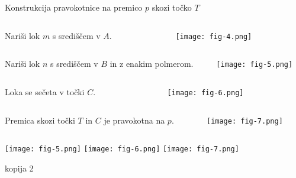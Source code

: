 \begin{frame}{Konstrukcija pravokotnice na premico $p$ skozi točko $T$}
			\begin{columns}
				\begin{column}{0.55\textwidth}
					Nariši lok $m$ s središčem v $A$.
				\end{column}
					\begin{column}{0.45\textwidth}
						\centering
						\texttt{[image: fig-4.png]}
					\end{column}
				\end{columns}


				\begin{columns}
					\begin{column}{0.55\textwidth}
						Nariši lok $n$ s središčem v $B$ in z enakim polmerom.
					\end{column}
						\begin{column}{0.45\textwidth}
							\centering
							\texttt{[image: fig-5.png]}
						\end{column}
					\end{columns}


					\begin{columns}
						\begin{column}{0.55\textwidth}
							Loka se sečeta v točki $C$.
						\end{column}
							\begin{column}{0.45\textwidth}
								\centering
								\texttt{[image: fig-6.png]}
							\end{column}
						\end{columns}


						\begin{columns}
							\begin{column}{0.55\textwidth}
								Premica skozi točki $T$ in $C$ je pravokotna na $p$.
							\end{column}
								\begin{column}{0.45\textwidth}
									\centering
									\texttt{[image: fig-7.png]}
								\end{column}
							\end{columns}

		 
		
		  \texttt{[image: fig-5.png]}
		  \texttt{[image: fig-6.png]}
		  \texttt{[image: fig-7.png]}

\end{frame}


kopija 2  


